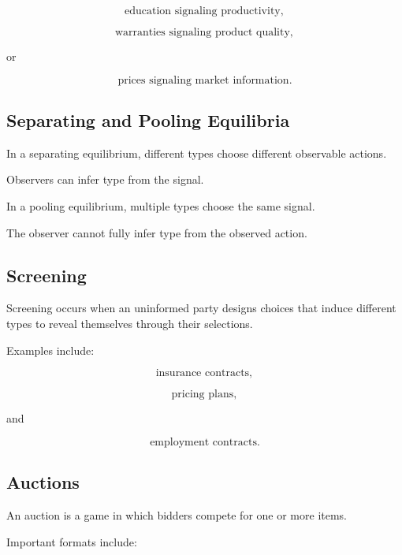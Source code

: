 \[
\boxed{
\text{education signaling productivity},
}
\]

\[
\boxed{
\text{warranties signaling product quality},
}
\]

or

\[
\boxed{
\text{prices signaling market information}.
}
\]

\subsection{Separating and Pooling Equilibria}
\label{subsec:separating-pooling}

In a separating equilibrium, different types choose different observable
actions.

Observers can infer type from the signal.

In a pooling equilibrium, multiple types choose the same signal.

The observer cannot fully infer type from the observed action.

\subsection{Screening}
\label{subsec:game-theory-screening}

Screening occurs when an uninformed party designs choices that induce
different types to reveal themselves through their selections.

Examples include:

\[
\boxed{
\text{insurance contracts},
}
\]

\[
\boxed{
\text{pricing plans},
}
\]

and

\[
\boxed{
\text{employment contracts}.
}
\]

\subsection{Auctions}
\label{subsec:game-theory-auctions}

An auction is a game in which bidders compete for one or more items.

Important formats include:

